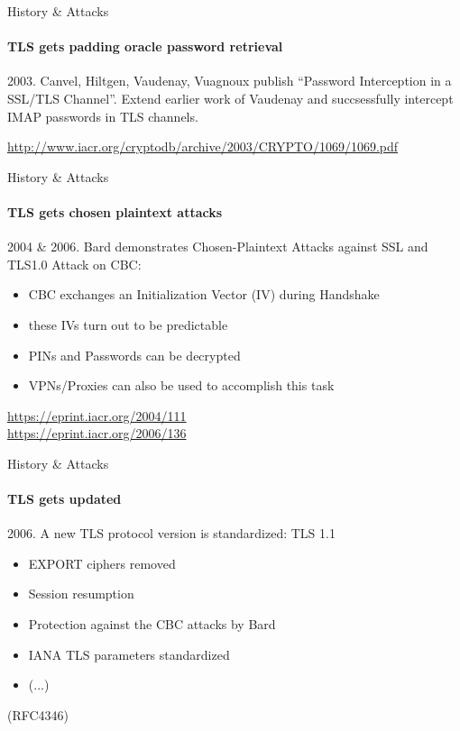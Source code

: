 \documentclass[hyperref={draft}]{beamer}
\begin{document}
\begin{frame}{History \& Attacks}
  \framesubtitle{TLS gets padding oracle password retrieval}
  2003. Canvel, Hiltgen, Vaudenay, Vuagnoux publish ``Password Interception in a SSL/TLS Channel''.
  \newline
  \newline
  Extend earlier work of Vaudenay and succsessfully intercept IMAP passwords in TLS channels.

  \vspace{95px}

  \tiny\url{http://www.iacr.org/cryptodb/archive/2003/CRYPTO/1069/1069.pdf}
\end{frame}

\begin{frame}{History \& Attacks}
  \framesubtitle{TLS gets chosen plaintext attacks}
  2004 \& 2006. Bard demonstrates Chosen-Plaintext Attacks against SSL and TLS1.0
  \newline
  \newline
  Attack on CBC:
  \begin{itemize}
    \item CBC exchanges an Initialization Vector (IV) during Handshake
    \item these IVs turn out to be predictable
    \item PINs and Passwords can be decrypted
    \item VPNs/Proxies can also be used to accomplish this task
  \end{itemize}
  
  \vspace{50px}

  \tiny
  \url{https://eprint.iacr.org/2004/111}\\
  \url{https://eprint.iacr.org/2006/136}
\end{frame}

\begin{frame}{History \& Attacks}
  \framesubtitle{TLS gets updated}
  2006. A new TLS protocol version is standardized: TLS 1.1
  \begin{itemize}
    \item EXPORT ciphers removed
    \item Session resumption 
    \item Protection against the CBC attacks by Bard
    \item IANA TLS parameters standardized
    \item (...)
  \end{itemize}
   (RFC4346)
\end{frame}
\end{document}

